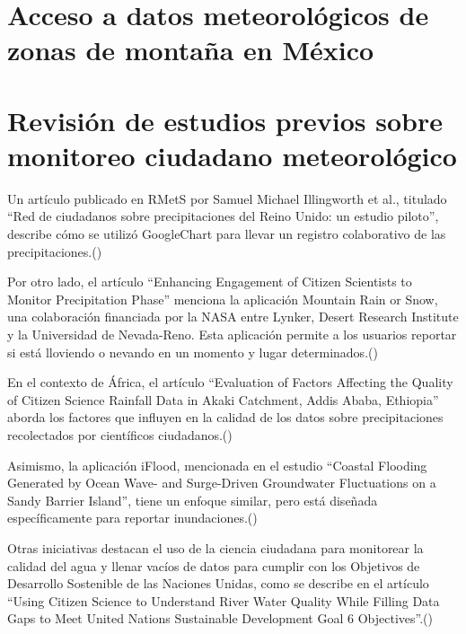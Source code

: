 \section{Acceso a datos meteorológicos de zonas de montaña en México}
















\section{Revisión de estudios previos sobre monitoreo ciudadano meteorológico}

Un artículo publicado en RMetS por Samuel Michael Illingworth et al., titulado “Red de ciudadanos sobre precipitaciones del Reino Unido: un estudio piloto”, describe cómo se utilizó GoogleChart para llevar un registro colaborativo de las precipitaciones.(\cite{illingworth2021ukprecipitation}) 

Por otro lado, el artículo “Enhancing Engagement of Citizen Scientists to Monitor Precipitation Phase” menciona la aplicación Mountain Rain or Snow, una colaboración financiada por la NASA entre Lynker, Desert Research Institute y la Universidad de Nevada-Reno. Esta aplicación permite a los usuarios reportar si está lloviendo o nevando en un momento y lugar determinados.(\cite{lute2021enhancing})


En el contexto de África, el artículo “Evaluation of Factors Affecting the Quality of Citizen Science Rainfall Data in Akaki Catchment, Addis Ababa, Ethiopia” aborda los factores que influyen en la calidad de los datos sobre precipitaciones recolectados por científicos ciudadanos.(\cite{tedla2022evaluation}) 

Asimismo, la aplicación iFlood, mencionada en el estudio “Coastal Flooding Generated by Ocean Wave- and Surge-Driven Groundwater Fluctuations on a Sandy Barrier Island”, tiene un enfoque similar, pero está diseñada específicamente para reportar inundaciones.(\cite{elgar2021coastal}) 


Otras iniciativas destacan el uso de la ciencia ciudadana para monitorear la calidad del agua y llenar vacíos de datos para cumplir con los Objetivos de Desarrollo Sostenible de las Naciones Unidas, como se describe en el artículo “Using Citizen Science to Understand River Water Quality While Filling Data Gaps to Meet United Nations Sustainable Development Goal 6 Objectives”.(\cite{mcginn2021using})

